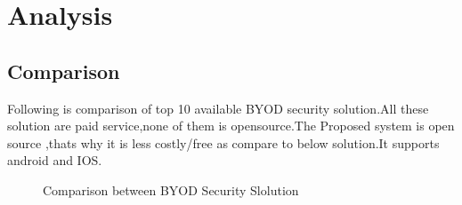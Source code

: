 	
\section{Analysis}
\subsection{Comparison}
\hspace{5mm}Following is comparison of top 10 available BYOD security solution.All these solution are paid service,none of them is opensource.The Proposed system is open source ,thats why it is less costly/free as compare to below solution.It supports android and IOS.

\begin{figure}[h!]
		\begin{center}
		\end{center}
		\caption {Comparison between BYOD Security Slolution}
		\label{vmb2}
		\vspace{0mm}
	\end{figure}

